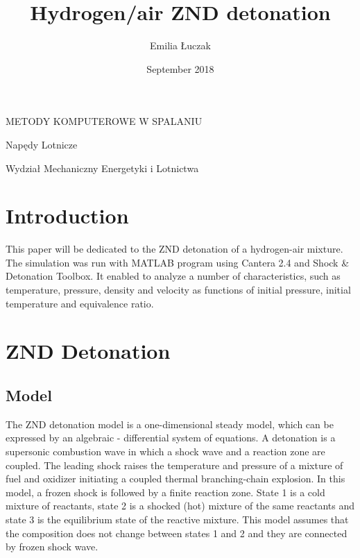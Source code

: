 \documentclass[a4paper]{article}
\title{Hydrogen/air ZND detonation}
\author{Emilia Łuczak}
\date{September 2018}
\newcommand{\sepspace}{\vspace*{1em}}
\begin{document}
\maketitle
\sepspace
 \begin{centering}
 METODY KOMPUTEROWE W SPALANIU\\
 \end{centering}
 \sepspace
 \sepspace
 \sepspace
 \sepspace
 \sepspace
 \sepspace
 \sepspace
 \sepspace
 \sepspace
 \sepspace
 \sepspace
 \sepspace
 \sepspace
 \sepspace
 \sepspace
 \sepspace
 \sepspace
 \sepspace
 \sepspace
 \sepspace
 \sepspace
 \sepspace
 \sepspace
 \sepspace
 \sepspace
 \sepspace
 \sepspace
 \sepspace
 \sepspace
 \sepspace
 \sepspace
 \sepspace
 \sepspace
 \sepspace
 \sepspace
 \sepspace
 \sepspace
 \sepspace
 \sepspace
 \sepspace
 \sepspace
 \sepspace
 \sepspace
 \sepspace
 \sepspace
 
 
 \begin{centering}
 Napędy Lotnicze\\
 \end{centering}
 \begin{centering}
 Wydział Mechaniczny Energetyki i Lotnictwa\\
 \end{centering}


\pagebreak
\section{Introduction}

This paper will be dedicated to the ZND detonation of a hydrogen-air mixture. The simulation was run with MATLAB program using Cantera 2.4 and Shock \& Detonation Toolbox. It enabled to analyze a number of characteristics, such as temperature, pressure, density and velocity as functions of initial pressure, initial temperature and equivalence ratio.

\sepspace
\sepspace
\section{ZND Detonation}

\subsection{Model}

The ZND detonation model is a one-dimensional steady model, which can be expressed by an algebraic - differential system of equations. A detonation is a supersonic combustion wave in which a shock wave and a reaction zone are coupled. The leading shock raises the temperature and pressure of a mixture of fuel and oxidizer initiating a coupled thermal branching-chain explosion. In this model, a frozen shock is followed by a finite reaction zone. State 1 is a cold mixture of reactants, state 2 is a shocked (hot) mixture of the same reactants and state 3 is the equilibrium state of the reactive mixture. This model assumes that the composition does not change between states 1 and 2 and they are connected by frozen shock wave. \\
\end{document}
